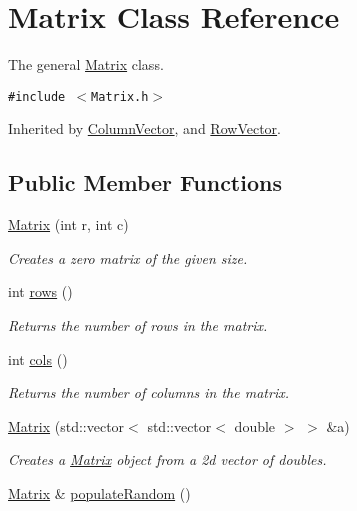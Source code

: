 \hypertarget{class_matrix}{
\section{Matrix Class Reference}
\label{class_matrix}
}
The general \hyperlink{class_matrix}{Matrix} class.  


{\tt \#include $<$Matrix.h$>$}

Inherited by \hyperlink{class_column_vector}{ColumnVector}, and \hyperlink{class_row_vector}{RowVector}.

\subsection*{Public Member Functions}
\begin{CompactItemize}
\item 
\hyperlink{class_matrix_07a3cee5bc286ca27ceffe81ce5a2d01}{Matrix} (int r, int c)
\begin{CompactList}\small\item\em Creates a zero matrix of the given size. \item\end{CompactList}\item 
int \hyperlink{class_matrix_dd9c23e5ff5e2456a8d48024ab19fe96}{rows} ()
\begin{CompactList}\small\item\em Returns the number of rows in the matrix. \item\end{CompactList}\item 
int \hyperlink{class_matrix_35649f43610688d020b2cad91f616d51}{cols} ()
\begin{CompactList}\small\item\em Returns the number of columns in the matrix. \item\end{CompactList}\item 
\hyperlink{class_matrix_0db283ef4ea2660f8d0c1b58f9e74f49}{Matrix} (std::vector$<$ std::vector$<$ double $>$ $>$ \&a)
\begin{CompactList}\small\item\em Creates a \hyperlink{class_matrix}{Matrix} object from a 2d vector of doubles. \item\end{CompactList}\item 
\hyperlink{class_matrix}{Matrix} \& \hyperlink{class_matrix_375fc575a7e042d0eed3d76c7470e59f}{populateRandom} ()

\end{CompactItemize}
